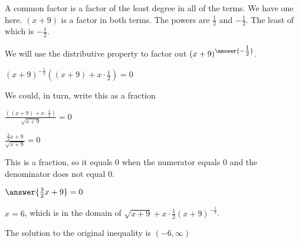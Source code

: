 \documentclass{ximera}
\begin{document}
\begin{example}
A common factor is a factor of the least degree in all of the terms.  We have one here. $(x+9)$ is a factor in both terms.  The powers are $\frac{1}{2}$ and $-\frac{1}{2}$. The least of which is $-\frac{1}{2}$.

We will use the distributive property to factor out $(x+9)^{\answer{-\tfrac{1}{2}}}$.


$(x+9)^{-\tfrac{1}{2}} \left((x+9) + x \cdot \frac{1}{2}\right)  = 0$


We could, in turn, write this as a fraction


$\frac{\left((x+9) + x \cdot \frac{1}{2}\right)}{\sqrt{x+9}} = 0$


$\frac{ \frac{3}{2} x + 9}{\sqrt{x+9}} = 0$



This is a fraction, so it equals $0$ when the numerator equals $0$ and the denominator does not equal $0$.


$\answer{\frac{3}{2} x + 9} = 0$



$x = 6$, which is in the domain of $\sqrt{x+9} + x \cdot \frac{1}{2} (x+9)^{-\tfrac{1}{2}}$.



The solution to the original inequality is $(-6, \infty)$

\end{example}
\end{document}
